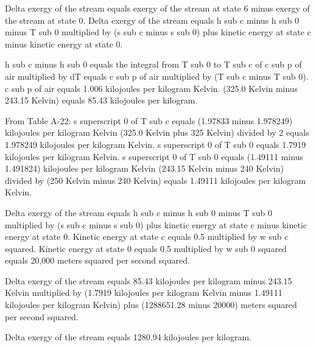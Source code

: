 Delta exergy of the stream equals exergy of the stream at state 6 minus exergy of the stream at state 0.  
Delta exergy of the stream equals h sub c minus h sub 0 minus T sub 0 multiplied by (s sub c minus s sub 0) plus kinetic energy at state c minus kinetic energy at state 0.  

h sub c minus h sub 0 equals the integral from T sub 0 to T sub c of c sub p of air multiplied by dT equals c sub p of air multiplied by (T sub c minus T sub 0).  
c sub p of air equals 1.006 kilojoules per kilogram Kelvin.  
(325.0 Kelvin minus 243.15 Kelvin) equals 85.43 kilojoules per kilogram.  

From Table A-22:  
s superscript 0 of T sub c equals (1.97833 minus 1.978249) kilojoules per kilogram Kelvin (325.0 Kelvin plus 325 Kelvin) divided by 2 equals 1.978249 kilojoules per kilogram Kelvin.  
s superscript 0 of T sub 0 equals 1.7919 kilojoules per kilogram Kelvin.  
s superscript 0 of T sub 0 equals (1.49111 minus 1.491824) kilojoules per kilogram Kelvin (243.15 Kelvin minus 240 Kelvin) divided by (250 Kelvin minus 240 Kelvin) equals 1.49111 kilojoules per kilogram Kelvin.  

Delta exergy of the stream equals h sub c minus h sub 0 minus T sub 0 multiplied by (s sub c minus s sub 0) plus kinetic energy at state c minus kinetic energy at state 0.  
Kinetic energy at state c equals 0.5 multiplied by w sub c squared.  
Kinetic energy at state 0 equals 0.5 multiplied by w sub 0 squared equals 20,000 meters squared per second squared.  

Delta exergy of the stream equals 85.43 kilojoules per kilogram minus 243.15 Kelvin multiplied by (1.7919 kilojoules per kilogram Kelvin minus 1.49111 kilojoules per kilogram Kelvin) plus (1288651.28 minus 20000) meters squared per second squared.  

Delta exergy of the stream equals 1280.94 kilojoules per kilogram.